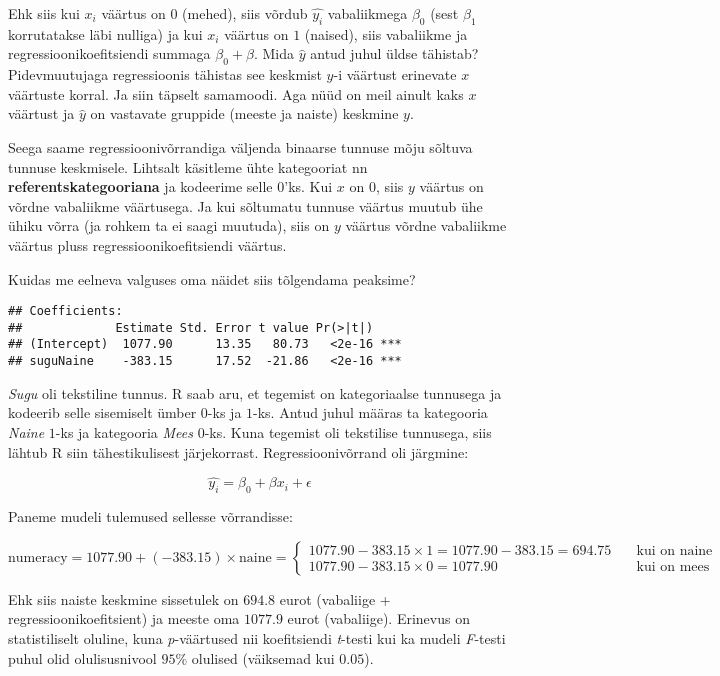 \documentclass[
]{book}
\begin{document}
Ehk siis kui \(x_i\) väärtus on \(0\) (mehed), siis võrdub \(\hat{y_i}\) vabaliikmega \(\beta_0\) (sest \(\beta_1\) korrutatakse läbi nulliga) ja kui \(x_i\) väärtus on \(1\) (naised), siis vabaliikme ja regressioonikoefitsiendi summaga \(\beta_0+\beta\). Mida \(\hat{y}\) antud juhul üldse tähistab? Pidevmuutujaga regressioonis tähistas see keskmist \(y\)-i väärtust erinevate \(x\) väärtuste korral. Ja siin täpselt samamoodi. Aga nüüd on meil ainult kaks \(x\) väärtust ja \(\hat{y}\) on vastavate gruppide (meeste ja naiste) keskmine \(y\).

Seega saame regressioonivõrrandiga väljenda binaarse tunnuse mõju sõltuva tunnuse keskmisele. Lihtsalt käsitleme ühte kategooriat nn \textbf{referentskategooriana} ja kodeerime selle \(0\)'ks. Kui \(x\) on \(0\), siis \(y\) väärtus on võrdne vabaliikme väärtusega. Ja kui sõltumatu tunnuse väärtus muutub ühe ühiku võrra (ja rohkem ta ei saagi muutuda), siis on \(y\) väärtus võrdne vabaliikme väärtus pluss regressioonikoefitsiendi väärtus.

Kuidas me eelneva valguses oma näidet siis tõlgendama peaksime?

\begin{verbatim}
## Coefficients:
##             Estimate Std. Error t value Pr(>|t|)    
## (Intercept)  1077.90      13.35   80.73   <2e-16 ***
## suguNaine    -383.15      17.52  -21.86   <2e-16 ***
\end{verbatim}

\emph{Sugu} oli tekstiline tunnus. R saab aru, et tegemist on kategoriaalse tunnusega ja kodeerib selle sisemiselt ümber \(0\)-ks ja \(1\)-ks. Antud juhul määras ta kategooria \emph{Naine} \(1\)-ks ja kategooria \emph{Mees} \(0\)-ks. Kuna tegemist oli tekstilise tunnusega, siis lähtub R siin tähestikulisest järjekorrast. Regressioonivõrrand oli järgmine:

\begin{equation}
\hat{y_i}=\beta_0+\beta x_i+\epsilon
\end{equation}

Paneme mudeli tulemused sellesse võrrandisse:

\[ \text{numeracy}=1077.90+(-383.15)\times \text{naine} =
  \begin{cases}
    1077.90-383.15\times 1 = 1077.90-383.15 = 694.75  & \quad \text{kui on naine}\\
    1077.90-383.15\times 0 = 1077.90  & \quad \text{kui on mees}
  \end{cases}
\]

Ehk siis naiste keskmine sissetulek on \(694.8\) eurot (vabaliige + regressioonikoefitsient) ja meeste oma \(1077.9\) eurot (vabaliige). Erinevus on statistiliselt oluline, kuna \emph{p}-väärtused nii koefitsiendi \emph{t}-testi kui ka mudeli \emph{F}-testi puhul olid olulisusnivool \(95\%\) olulised (väiksemad kui \(0.05\)).
\end{document}
